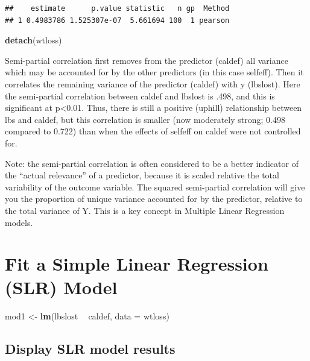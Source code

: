 \documentclass[]{article}
\newenvironment{Shaded}{\begin{snugshade}}{\end{snugshade}}
\newcommand{\KeywordTok}[1]{\textcolor[rgb]{0.13,0.29,0.53}{\textbf{#1}}}
\newcommand{\DataTypeTok}[1]{\textcolor[rgb]{0.13,0.29,0.53}{#1}}
\newcommand{\StringTok}[1]{\textcolor[rgb]{0.31,0.60,0.02}{#1}}
\newcommand{\OperatorTok}[1]{\textcolor[rgb]{0.81,0.36,0.00}{\textbf{#1}}}
\newcommand{\NormalTok}[1]{#1}
\begin{document}
\begin{verbatim}
##    estimate      p.value statistic   n gp  Method
## 1 0.4983786 1.525307e-07  5.661694 100  1 pearson
\end{verbatim}

\begin{Shaded}
\begin{Highlighting}[]
\KeywordTok{detach}\NormalTok{(wtloss)}
\end{Highlighting}
\end{Shaded}

Semi-partial correlation first removes from the predictor (caldef) all
variance which may be accounted for by the other predictors (in this
case selfeff). Then it correlates the remaining variance of the
predictor (caldef) with y (lbslost). Here the semi-partial correlation
between caldef and lbslost is .498, and this is significant at
p\textless{}0.01. Thus, there is still a positive (uphill) relationship
between lbs and caldef, but this correlation is smaller (now moderately
strong; 0.498 compared to 0.722) than when the effects of selfeff on
caldef were not controlled for.

Note: the semi-partial correlation is often considered to be a better
indicator of the ``actual relevance'' of a predictor, because it is
scaled relative the total variability of the outcome variable. The
squared semi-partial correlation will give you the proportion of unique
variance accounted for by the predictor, relative to the total variance
of Y. This is a key concept in Multiple Linear Regression models.

\section{Fit a Simple Linear Regression (SLR)
Model}\label{fit-a-simple-linear-regression-slr-model}

\begin{Shaded}
\begin{Highlighting}[]
\NormalTok{mod1 <-}\StringTok{ }\KeywordTok{lm}\NormalTok{(lbslost }\OperatorTok{~}\StringTok{ }\NormalTok{caldef, }\DataTypeTok{data =}\NormalTok{ wtloss)}
\end{Highlighting}
\end{Shaded}

\subsection{Display SLR model results}\label{display-slr-model-results}
\end{document}
